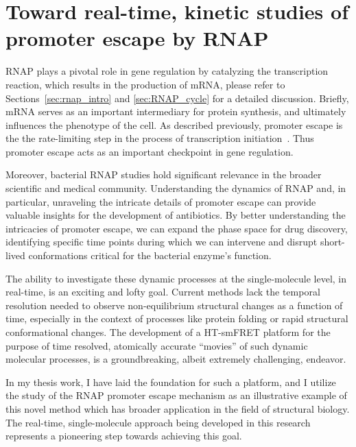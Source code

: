 \chapter{Toward real-time, kinetic studies of promoter escape by RNAP}
\label{chpt:towards_promoter-escape_movie}

RNAP plays a pivotal role in gene regulation by catalyzing the transcription reaction, which results in the production of \ac{mRNA}, please refer to Sections~\ref{sec:rnap_intro} and \ref{sec:RNAP_cycle} for a detailed discussion. 
Briefly, \ac{mRNA} serves as an important intermediary for protein synthesis, and ultimately influences the phenotype of the cell.
As described previously, promoter escape is the the rate-limiting step in the process of transcription initiation~\cite{murakami_structural_2002}. 
Thus promoter escape acts as an important checkpoint in gene regulation.

Moreover, bacterial \ac{RNAP} studies hold significant relevance in the broader scientific and medical community. 
Understanding the dynamics of \ac{RNAP} and, in particular, unraveling the intricate details of promoter escape can provide valuable insights for the development of antibiotics. 
By better understanding the intricacies of promoter escape, we can expand the phase space for drug discovery, identifying specific time points during which we can intervene and disrupt short-lived conformations critical for the bacterial enzyme's function.

The ability to investigate these dynamic processes at the single-molecule level, in real-time, is an exciting and lofty goal. 
Current methods lack the temporal resolution needed to observe non-equilibrium structural changes as a function of time, especially in the context of processes like protein folding or rapid structural conformational changes. 
The development of a \ac{HT-smFRET} platform for the purpose of time resolved, atomically accurate \enquote{movies} of such dynamic molecular processes, is a groundbreaking, albeit extremely challenging, endeavor.

In my thesis work, I have laid the foundation for such a platform, and I utilize the study of the \ac{RNAP} promoter escape mechanism as an illustrative example of this novel method which has broader application in the field of structural biology.
The real-time, single-molecule approach being developed in this research represents a pioneering step towards achieving this goal.

